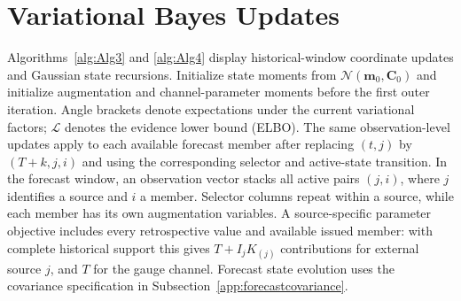 \section{Variational Bayes Updates}
\label{app:vbupdates}

Algorithms~\ref{alg:Alg3} and \ref{alg:Alg4} display historical-window coordinate updates and Gaussian state recursions. Initialize state moments from $\mathcal N(\mathbf m_0,\mathbf C_0)$ and initialize augmentation and channel-parameter moments before the first outer iteration. Angle brackets denote expectations under the current variational factors; $\mathcal L$ denotes the evidence lower bound (ELBO). The same observation-level updates apply to each available forecast member after replacing $(t,j)$ by $(T+k,j,i)$ and using the corresponding selector and active-state transition. In the forecast window, an observation vector stacks all active pairs \((j,i)\), where \(j\) identifies a source and \(i\) a member. Selector columns repeat within a source, while each member has its own augmentation variables. A source-specific parameter objective includes every retrospective value and available issued member: with complete historical support this gives \(T+I_jK_{(j)}\) contributions for external source \(j\), and \(T\) for the gauge channel. Forecast state evolution uses the covariance specification in Subsection~\ref{app:forecastcovariance}.


